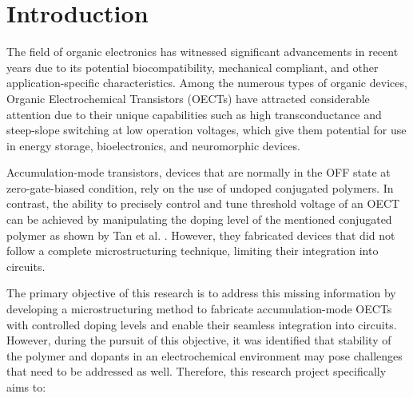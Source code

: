 \chapter{Introduction}
\label{cha:intro}

The field of organic electronics has witnessed significant advancements in recent years due to its potential biocompatibility, mechanical compliant, and other application-specific characteristics. Among the numerous types of organic devices, Organic Electrochemical Transistors (OECTs) have attracted considerable attention due to their unique capabilities such as high transconductance and steep-slope switching at low operation voltages, which give them potential for use in energy storage, bioelectronics, and neuromorphic devices. 

Accumulation-mode transistors, devices that are normally in the OFF state at zero-gate-biased condition, rely on the use of undoped conjugated polymers. In contrast, the ability to precisely control and tune threshold voltage of an OECT can be achieved by manipulating the doping level of the mentioned conjugated polymer as shown by Tan et al. \cite{tanTuningOrganicElectrochemical2022}.  However, they fabricated devices that did not follow a complete microstructuring technique, limiting their integration into circuits. 



The primary objective of this research is to address this missing information by developing a microstructuring method to fabricate accumulation-mode OECTs with controlled doping levels and enable their seamless integration into circuits. However, during the pursuit of this objective, it was identified that stability of the polymer and dopants in an electrochemical environment may pose challenges that need to be addressed as well. Therefore, this research project specifically aims to:

